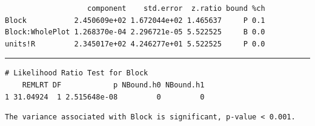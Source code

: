 \documentclass[a4paper, 10pt, fleqn, twosided]{memoir}
\begin{document}
\begin{tcolorbox}[title = Exercise 13 output]
\begin{verbatim}
                   component    std.error  z.ratio bound %ch
Block           2.450609e+02 1.672044e+02 1.465637     P 0.1
Block:WholePlot 1.268370e-04 2.296721e-05 5.522525     B 0.0
units!R         2.345017e+02 4.246277e+01 5.522525     P 0.0
\end{verbatim}
{\color{outpt} {\hrule height 1pt}}

\begin{verbatim}
# Likelihood Ratio Test for Block
    REMLRT DF            p NBound.h0 NBound.h1
1 31.04924  1 2.515648e-08         0         0

\end{verbatim}
\end{tcolorbox}

\begin{tcolorbox}[title = Exercise 13 interpretation]
\begin{verbatim}
The variance associated with Block is significant, p-value < 0.001.
\end{verbatim}
\end{tcolorbox}
\end{document}
